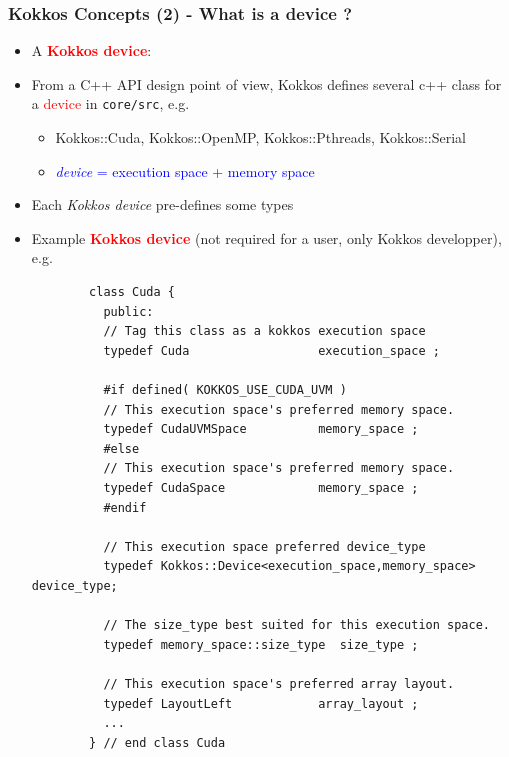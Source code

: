 \begin{frame}[fragile=singleslide]
  \frametitle{Kokkos Concepts (2) - What is a device ?}

  \begin{itemize}
  \item A \textcolor{red}{\textbf{Kokkos device}}: 
  \item From a C++ API design point of view, Kokkos defines several c++ class for a \textcolor{red}{device} in \texttt{core/src}, e.g.
    \begin{itemize}
    \item Kokkos::Cuda, Kokkos::OpenMP, Kokkos::Pthreads, Kokkos::Serial
    \item \textcolor{blue}{\textit{device} = execution space + memory space}
    \end{itemize}
  \item Each \textit{Kokkos device} pre-defines some types
  \item Example \textcolor{red}{\textbf{Kokkos device}} (not required for a user, only Kokkos developper), e.g.\\
    {\tiny
      \begin{verbatim}
        class Cuda {
          public:
          // Tag this class as a kokkos execution space
          typedef Cuda                  execution_space ;
          
          #if defined( KOKKOS_USE_CUDA_UVM )
          // This execution space's preferred memory space.
          typedef CudaUVMSpace          memory_space ;
          #else
          // This execution space's preferred memory space.
          typedef CudaSpace             memory_space ;
          #endif
          
          // This execution space preferred device_type
          typedef Kokkos::Device<execution_space,memory_space> device_type;
          
          // The size_type best suited for this execution space.
          typedef memory_space::size_type  size_type ;
          
          // This execution space's preferred array layout.
          typedef LayoutLeft            array_layout ;
          ...
        } // end class Cuda
        \end{verbatim}
      }
  \end{itemize}

\end{frame}

